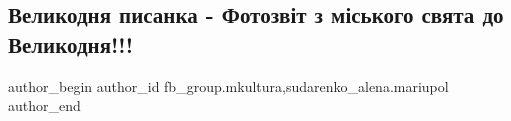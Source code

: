 
 
 
 
 
 
\subsection{Великодня писанка - Фотозвіт з міського свята до Великодня!!!}
\label{sec:02_05_2019.fb.fb_group.mkultura.1.velykodnja_pysanka_fotosvit}
 
\ifcmt
 author_begin
   author_id fb_group.mkultura,sudarenko_alena.mariupol
 author_end
\fi
